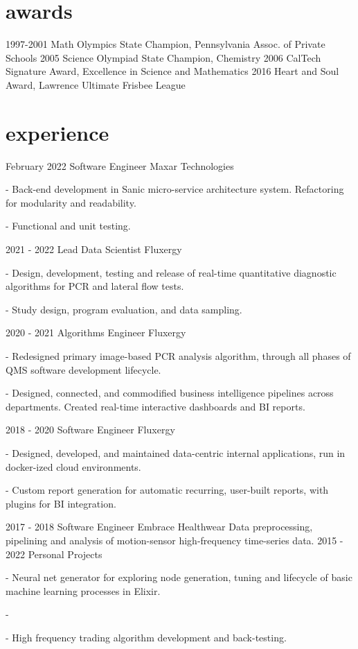 \documentclass[]{twentysecondcv}
\begin{document}

\section{awards}

\begin{twentyshort}
  \twentyitemshort
    {1997-2001}
    {Math Olympics State Champion, Pennsylvania Assoc. of Private Schools}
  \twentyitemshort
    {2005}
    {Science Olympiad State Champion, Chemistry}
  \twentyitemshort
    {2006}
    {CalTech Signature Award, Excellence in Science and Mathematics}
  \twentyitemshort
    {2016}
    {Heart and Soul Award, Lawrence Ultimate Frisbee League}
\end{twentyshort}


\section{experience}

\begin{twenty}
  \twentyitem
    {February 2022}
    {Software Engineer}
    {Maxar Technologies}
    {- Back-end development in Sanic micro-service architecture system. Refactoring for modularity and readability.

        - Functional and unit testing.
	
}

  \twentyitem
    {2021 - 2022}
    {Lead Data Scientist}
    {Fluxergy}
    {- Design, development, testing and release of real-time quantitative diagnostic algorithms for PCR and lateral flow tests.

	- Study design, program evaluation, and data sampling.
	} 
  \twentyitem
    {2020 - 2021}
    {Algorithms Engineer}
    {Fluxergy}
    {- Redesigned primary image-based PCR analysis algorithm, through all phases of QMS software development lifecycle.

	- Designed, connected, and commodified business intelligence pipelines across departments. Created real-time interactive dashboards and BI reports.
	} 
  \twentyitem
    {2018 - 2020}
    {Software Engineer}
    {Fluxergy}
    {- Designed, developed, and maintained data-centric internal applications, run in docker-ized cloud environments.

	- Custom report generation for automatic recurring, user-built reports, with plugins for BI integration.
	} 
  \twentyitem
    {2017 - 2018}
    {Software Engineer}
    {Embrace Healthwear}
    {Data preprocessing, pipelining and analysis of motion-sensor high-frequency time-series data.
	} 
  \twentyitem
    {2015 - 2022}
    {Personal Projects}
    {}
    {- Neural net generator for exploring node generation, tuning and lifecycle of basic machine learning processes in Elixir.

     - 

	- High frequency trading algorithm development and back-testing.} 
\end{twenty}
\end{document}
